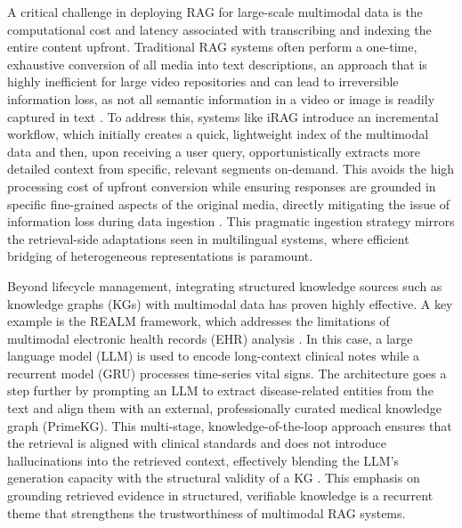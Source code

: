 \documentclass[11pt]{article}
\begin{document}
A critical challenge in deploying RAG for large-scale multimodal data is the computational cost and latency associated with transcribing and indexing the entire content upfront. Traditional RAG systems often perform a one-time, exhaustive conversion of all media into text descriptions, an approach that is highly inefficient for large video repositories and can lead to irreversible information loss, as not all semantic information in a video or image is readily captured in text \cite{ref354}. To address this, systems like iRAG introduce an incremental workflow, which initially creates a quick, lightweight index of the multimodal data and then, upon receiving a user query, opportunistically extracts more detailed context from specific, relevant segments on-demand. This avoids the high processing cost of upfront conversion while ensuring responses are grounded in specific fine-grained aspects of the original media, directly mitigating the issue of information loss during data ingestion \cite{ref354}. This pragmatic ingestion strategy mirrors the retrieval-side adaptations seen in multilingual systems, where efficient bridging of heterogeneous representations is paramount.

Beyond lifecycle management, integrating structured knowledge sources such as knowledge graphs (KGs) with multimodal data has proven highly effective. A key example is the REALM framework, which addresses the limitations of multimodal electronic health records (EHR) analysis \cite{ref355}. In this case, a large language model (LLM) is used to encode long-context clinical notes while a recurrent model (GRU) processes time-series vital signs. The architecture goes a step further by prompting an LLM to extract disease-related entities from the text and align them with an external, professionally curated medical knowledge graph (PrimeKG). This multi-stage, knowledge-of-the-loop approach ensures that the retrieval is aligned with clinical standards and does not introduce hallucinations into the retrieved context, effectively blending the LLM's generation capacity with the structural validity of a KG \cite{ref355}. This emphasis on grounding retrieved evidence in structured, verifiable knowledge is a recurrent theme that strengthens the trustworthiness of multimodal RAG systems.
\end{document}
